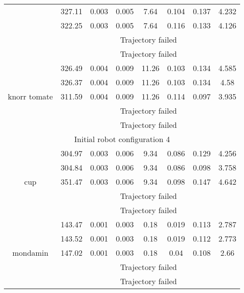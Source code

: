 {\begin{center}
\begin{longtable}[c]{ | c | c | c | c | c | c | c || c || }
& 327.11 & 0.003 & 0.005 & 7.64 & 0.104 & 0.137 & 4.232 \\ 
& 322.25 & 0.003 & 0.005 & 7.64 & 0.116 & 0.133 & 4.126 \\ 
& \multicolumn{7}{c|}{Trajectory failed} \\ 
& \multicolumn{7}{c|}{Trajectory failed} \\ 
\hline 
\multirow{5}{1.5cm}{knorr tomate}& 326.49 & 0.004 & 0.009 & 11.26 & 0.103 & 0.134 & 4.585 \\ 
& 326.37 & 0.004 & 0.009 & 11.26 & 0.103 & 0.134 & 4.58 \\
& 311.59 & 0.004 & 0.009 & 11.26 & 0.114 & 0.097 & 3.935 \\ 
& \multicolumn{7}{c|}{Trajectory failed} \\ 
& \multicolumn{7}{c|}{Trajectory failed} \\ 
\hline 
\multicolumn{8}{|c|}{Initial robot configuration 4} \\
\hline
\multirow{5}{1.5cm}{cup}& 304.97 & 0.003 & 0.006 & 9.34 & 0.086 & 0.129 & 4.256 \\ 
& 304.84 & 0.003 & 0.006 & 9.34 & 0.086 & 0.098 & 3.758 \\ 
& 351.47 & 0.003 & 0.006 & 9.34 & 0.098 & 0.147 & 4.642 \\ 
& \multicolumn{7}{c|}{Trajectory failed} \\ 
& \multicolumn{7}{c|}{Trajectory failed} \\ 
\hline 
\multirow{5}{1.5cm}{mondamin}& 143.47 & 0.001 & 0.003 & 0.18 & 0.019 & 0.113 & 2.787 \\ 
& 143.52 & 0.001 & 0.003 & 0.18 & 0.019 & 0.112 & 2.773 \\ 
& 147.02 & 0.001 & 0.003 & 0.18 & 0.04 & 0.108 & 2.66 \\ 
& \multicolumn{7}{c|}{Trajectory failed} \\ 
& \multicolumn{7}{c|}{Trajectory failed} \\ 
\hline 

\hline 

\end{longtable}
\end{center}
}
